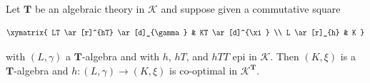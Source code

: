 Let $\mathbf{T}$ be an algebraic theory in $\mathcal{K}$ and suppose given a commutative square

$$\xymatrix{
LT \ar[r]^{hT} \ar[d]_{\gamma} & KT \ar[d]^{\xi} \\
L \ar[r]_{h} & K
}$$

with $(L, \gamma)$ a $\mathbf{T}$-algebra and with $h$, $hT$, and $hTT$ epi in $\mathcal{K}$. Then $(K, \xi)$ is a $\mathbf{T}$-algebra and $h: (L, \gamma) \to (K, \xi)$ is co-optimal in $\mathcal{K}^{\mathbf{T}}$.
